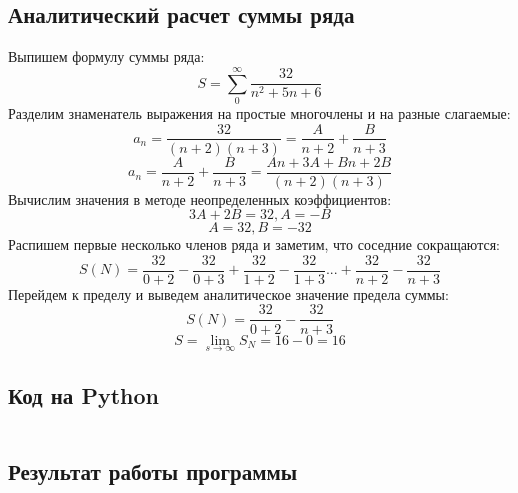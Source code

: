 \documentclass[a4paper,12pt]{article}
\newenvironment{longlisting}{\captionsetup{type=listing}}{}
\begin{document}
\subsection{Аналитический расчет суммы ряда}
Выпишем формулу суммы ряда:
   $$S = \sum_{0}^{\infty} \frac{32}{n^2 +5n + 6}$$
Разделим знаменатель выражения на простые многочлены и на разные слагаемые:
   $$a_n =  \frac{32}{(n+2)(n+3)} = \frac{A}{n+2} + \frac{B}{n+3}$$
   $$$$
   $$a_n = \frac{A}{n+2} + \frac{B}{n+3} = \frac{An + 3A + Bn + 2B}{(n+2)(n+3)}$$
Вычислим значения в методе неопределенных коэффициентов:
   $$3A + 2B = 32, A=-B$$
   $$A=32, B=-32$$
Распишем первые несколько членов ряда и заметим, что соседние сокращаются:
   $$S(N) = \frac{32}{0+2} - \frac{32}{0+3} + \frac{32}{1+2} - \frac{32}{1+3}  ... + \frac{32}{n+2} - \frac{32}{n+3}$$
Перейдем к пределу и выведем аналитическое значение предела суммы:
   $$S(N) = \frac{32}{0+2} - \frac{32}{n+3}$$
   $$S = \lim_{s\rightarrow \infty}S_N = 16 - 0 = 16$$

\subsection{Код на Python}

\begin{longlisting}
\inputminted{python}{src/series.py}
\end{longlisting}

\subsection{Результат работы программы}
\begin{longlisting}

\end{longlisting}
\end{document}
